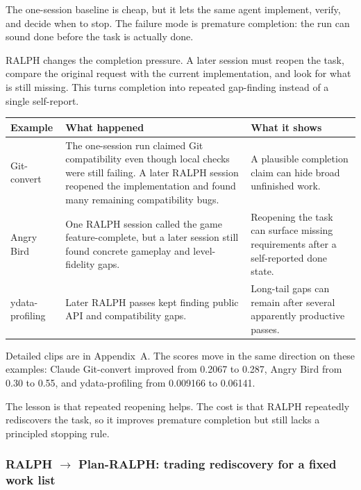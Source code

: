 \documentclass[11pt,a4paper]{article}
\renewcommand{\arraystretch}{1.18}
\newcommand{\code}[1]{#1}
\begin{document}
The one-session baseline is cheap, but it lets the same agent implement, verify, and decide when to stop. The failure mode is premature completion: the run can sound done before the task is actually done.

RALPH changes the completion pressure. A later session must reopen the task, compare the original request with the current implementation, and look for what is still missing. This turns completion into repeated gap-finding instead of a single self-report.

\begingroup
\renewcommand{\arraystretch}{1.25}
\setlength{\tabcolsep}{6pt}
\footnotesize
\noindent\begin{tabular}{@{}p{2.6cm}p{6.5cm}p{5.5cm}@{}}
\toprule
\rowcolor{tablehead}\textbf{\color{white}Example} & \textbf{\color{white}What happened} & \textbf{\color{white}What it shows} \\
\midrule
\code{Git-convert} & The one-session run claimed Git compatibility even though local checks were still failing. A later RALPH session reopened the implementation and found many remaining compatibility bugs. & A plausible completion claim can hide broad unfinished work. \\
\rowcolor{tableband}
\code{Angry Bird} & One RALPH session called the game feature-complete, but a later session still found concrete gameplay and level-fidelity gaps. & Reopening the task can surface missing requirements after a self-reported done state. \\
\code{ydata-profiling} & Later RALPH passes kept finding public API and compatibility gaps. & Long-tail gaps can remain after several apparently productive passes. \\
\bottomrule
\end{tabular}
\endgroup

\vspace{6pt}

Detailed clips are in Appendix~A. The scores move in the same direction on these examples: Claude \code{Git-convert} improved from \code{0.2067} to \code{0.287}, \code{Angry Bird} from \code{0.30} to \code{0.55}, and \code{ydata-profiling} from \code{0.009166} to \code{0.06141}.

The lesson is that repeated reopening helps. The cost is that RALPH repeatedly rediscovers the task, so it improves premature completion but still lacks a principled stopping rule.

\subsubsection{RALPH $\rightarrow$ Plan-RALPH: trading rediscovery for a fixed work list}
\end{document}
